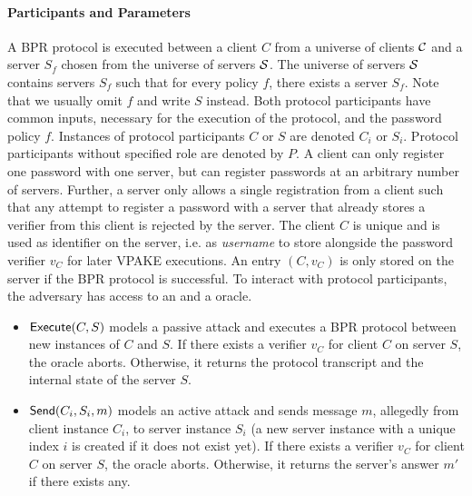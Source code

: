 \paragraph{Participants and Parameters}
A BPR protocol is executed between a client $C$ from a universe of clients $\mathcal{C}$ and a server $S_f$ chosen from the universe of servers $\mathcal{S}$.
The universe of servers $\mathcal{S}$ contains servers $S_f$ such that for every policy $f$, there exists a server $S_f$.
Note that we usually omit $f$ and write $S$ instead.
Both protocol participants have common inputs, necessary for the execution of the protocol, and the password policy $f$.
Instances of protocol participants $C$ or $S$ are denoted $C_i$ or $S_i$. %
Protocol participants without specified role are denoted by $P$.
A client can only register one password with one server, but can register passwords at an arbitrary number of servers.
Further, a server only allows a single registration from a client such that any attempt to register a password with a server that already stores a verifier from this client is rejected by the server.
The client $C$ is unique and is used as identifier on the server, i.e. as \emph{username} to store alongside the password verifier $v_C$ for later VPAKE executions.
An entry $(C,v_C)$ is only stored on the server if the BPR protocol is successful.
%
%
%
To interact with protocol participants, the adversary has access to an \Execute and a \Send oracle.

\begin{itemize}
  \item $\mathsf{Execute}(C,S)$ models a passive attack and executes a BPR protocol between new instances of $C$ and $S$.
        If there exists a verifier $v_C$ for client $C$ on server $S$, the oracle aborts.
        Otherwise, it returns the protocol transcript and the internal state of the server $S$.
  \item $\mathsf{Send}(C_i,S_i,m)$ models an active attack and sends message $m$, allegedly from client instance $C_i$, to server instance $S_i$ (a new server instance with a unique index $i$ is created if it does not exist yet).
        If there exists a verifier $v_C$ for client $C$ on server $S$, the oracle aborts.
        Otherwise, it returns the server's answer $m'$ if there exists any.
\end{itemize}

